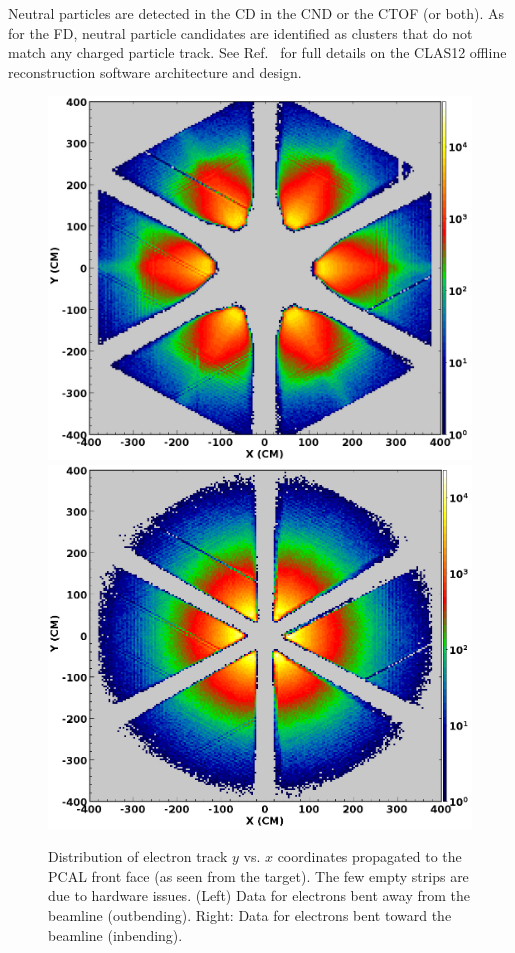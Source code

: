 \documentclass[final,3p,twocolumn]{elsarticle}
\begin{document}
Neutral particles are detected in the CD in the CND or the CTOF (or both). As for the FD, neutral particle candidates
are identified as clusters that do not match any charged particle track. See Ref.~\cite{Software} for full details on
the CLAS12 offline reconstruction software architecture and design.

\begin{figure}[t!]
\centerline{\includegraphics[width=1.0\columnwidth]{e-outbending.png}
\hspace{0.5cm}\includegraphics[width=1.0\columnwidth]{e-inbending.png}}
\caption{Distribution of electron track $y$ vs. $x$ coordinates propagated to the PCAL front face (as seen from
  the target). The few empty strips are due to hardware issues. (Left) Data for electrons bent away from the
  beamline (outbending). Right: Data for electrons bent toward the beamline (inbending).} 
\label{electrons-xy}
\end{figure}
\end{document}

